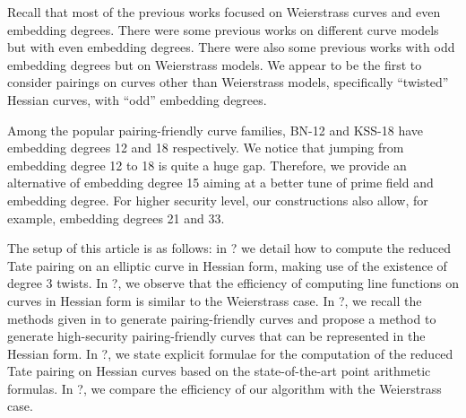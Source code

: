 Recall that most of the previous works focused on Weierstrass curves and even embedding degrees.
There were some previous works on different curve models but with even embedding degrees.
There were also some previous works with odd embedding degrees but on Weierstrass models.
We appear to be the first to consider pairings on curves other than Weierstrass models,
specifically ``twisted'' Hessian curves, with ``odd'' embedding degrees.

Among the popular pairing-friendly curve families,
BN-12 and KSS-18 have embedding degrees 12 and 18 respectively.
We notice that jumping from embedding degree 12 to 18 is quite a huge gap.
Therefore, we provide an alternative of embedding degree 15 aiming at a better tune of prime field and embedding degree.
For higher security level, our constructions also allow, for example, embedding degrees 21 and 33.

The setup of this article is as follows:
in ? we detail how to compute the reduced Tate pairing on an elliptic curve in Hessian form, making use of the existence of degree 3 twists.
In ?, we observe that the efficiency of computing line functions on curves in Hessian form is similar to the Weierstrass case.
In ?, we recall the methods given in \cite{2010/freeman} to generate pairing-friendly curves
and propose a method to generate high-security pairing-friendly curves
that can be represented in the Hessian form.
In ?, we state explicit formulae for the computation of the reduced Tate pairing on Hessian curves based on the state-of-the-art point arithmetic formulas.
In ?, we compare the efficiency of our algorithm with the Weierstrass case.


